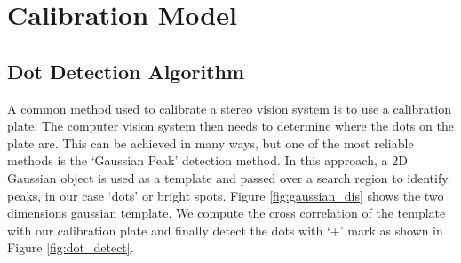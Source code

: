 \chapter{Calibration Model}


\section{Dot Detection Algorithm}

A common method used to calibrate a stereo vision system is to use a calibration plate. The computer vision system then needs to determine where the dots on the plate are. This can be achieved in many ways, but one of the most reliable methods is the ‘Gaussian Peak’ detection method. In this approach, a 2D Gaussian object is used as a template and passed over a search region to identify peaks, in our case ‘dots’ or bright spots. Figure \ref{fig:gaussian_dis} shows the two dimensions gaussian template. We compute the cross correlation of the template with our calibration plate and finally detect the dots with `+' mark as shown in Figure \ref{fig:dot_detect}.

